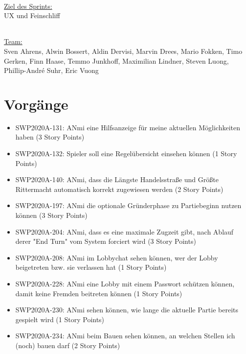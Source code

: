\documentclass[12pt,a4paper, oneside]{article}
\begin{document}
    \noindent
    \\
    \underline{Ziel des Sprints:}
    \\
    UX und Feinschliff

    \noindent
    \\
    \underline {Team:}
    \\
    Sven Ahrens, Alwin Bossert, Aldin Dervisi, Marvin Drees, Mario Fokken,
    Timo Gerken, Finn Haase, Temmo Junkhoff, Maximilian Lindner, Steven Luong,
    Phillip-André Suhr, Eric Vuong


    \section{Vorgänge}

    \begin{itemize}
        \item SWP2020A-131:	ANmi eine Hilfsanzeige für meine aktuellen Möglichkeiten haben (3 Story Points)

        \item SWP2020A-132:	Spieler soll eine Regelübersicht einsehen können (1 Story Points)

        \item SWP2020A-140:	ANmi, dass die Längste Handelsstraße und Größte Rittermacht automatisch korrekt zugewiesen werden (2 Story Points)

        \item SWP2020A-197:	ANmi die optionale Gründerphase zu Partiebeginn nutzen können (3 Story Points)

        \item SWP2020A-204:	ANmi, dass es eine maximale Zugzeit gibt, nach Ablauf derer "End Turn" vom System forciert wird (3 Story Points)

        \item SWP2020A-208:	ANmi im Lobbychat sehen können, wer der Lobby beigetreten bzw. sie verlassen hat (1 Story Points)

        \item SWP2020A-228:	ANmi eine Lobby mit einem Passwort schützen können, damit keine Fremden beitreten können (1 Story Points)

        \item SWP2020A-230:	ANmi sehen können, wie lange die aktuelle Partie bereits gespielt wird (1 Story Points)

        \item SWP2020A-234:	ANmi beim Bauen sehen können, an welchen Stellen ich (noch) bauen darf (2 Story Points)


\end{itemize}
\end{document}
